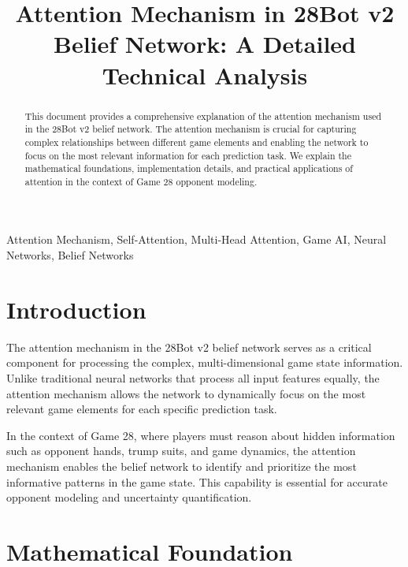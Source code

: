 \documentclass[conference]{IEEEtran}
\begin{document}
\title{Attention Mechanism in 28Bot v2 Belief Network: A Detailed Technical Analysis}

\author{
}

\maketitle

\begin{abstract}
This document provides a comprehensive explanation of the attention mechanism used in the 28Bot v2 belief network. The attention mechanism is crucial for capturing complex relationships between different game elements and enabling the network to focus on the most relevant information for each prediction task. We explain the mathematical foundations, implementation details, and practical applications of attention in the context of Game 28 opponent modeling.
\end{abstract}

\begin{IEEEkeywords}
Attention Mechanism, Self-Attention, Multi-Head Attention, Game AI, Neural Networks, Belief Networks
\end{IEEEkeywords}

\section{Introduction}

The attention mechanism in the 28Bot v2 belief network serves as a critical component for processing the complex, multi-dimensional game state information. Unlike traditional neural networks that process all input features equally, the attention mechanism allows the network to dynamically focus on the most relevant game elements for each specific prediction task.

In the context of Game 28, where players must reason about hidden information such as opponent hands, trump suits, and game dynamics, the attention mechanism enables the belief network to identify and prioritize the most informative patterns in the game state. This capability is essential for accurate opponent modeling and uncertainty quantification.

\section{Mathematical Foundation}
\end{document}
